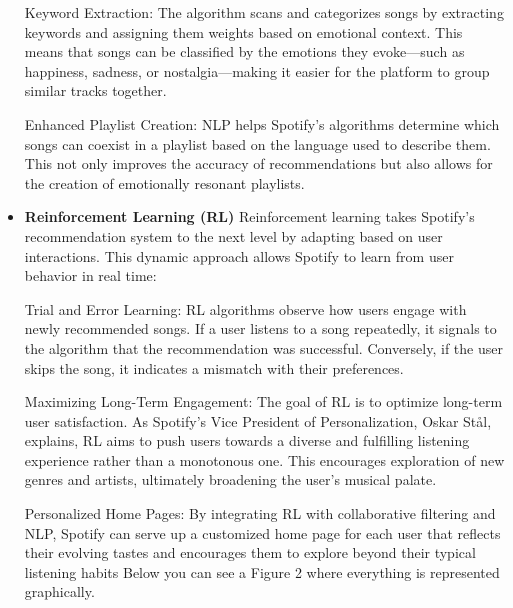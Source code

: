 \documentclass[12pt,a4paper]{article}
\begin{document}
\begin{itemize}
Keyword Extraction: The algorithm scans and categorizes songs by extracting keywords and assigning them weights based on emotional context. This means that songs can be classified by the emotions they evoke—such as happiness, sadness, or nostalgia—making it easier for the platform to group similar tracks together.

Enhanced Playlist Creation: NLP helps Spotify’s algorithms determine which songs can coexist in a playlist based on the language used to describe them. This not only improves the accuracy of recommendations but also allows for the creation of emotionally resonant playlists\citep{key}.

 \item \textbf{Reinforcement Learning (RL)}
Reinforcement learning takes Spotify’s recommendation system to the next level by adapting based on user interactions. This dynamic approach allows Spotify to learn from user behavior in real time:

Trial and Error Learning: RL algorithms observe how users engage with newly recommended songs. If a user listens to a song repeatedly, it signals to the algorithm that the recommendation was successful. Conversely, if the user skips the song, it indicates a mismatch with their preferences\citep{spotifys}.

Maximizing Long-Term Engagement: The goal of RL is to optimize long-term user satisfaction. As Spotify's Vice President of Personalization, Oskar Stål, explains, RL aims to push users towards a diverse and fulfilling listening experience rather than a monotonous one. This encourages exploration of new genres and artists, ultimately broadening the user's musical palate\citep{key}.

Personalized Home Pages: By integrating RL with collaborative filtering and NLP, Spotify can serve up a customized home page for each user that reflects their evolving tastes and encourages them to explore beyond their typical listening habits\citep{roma} Below you can see a Figure 2 where everything is represented graphically.

\end{itemize}
\end{document}
